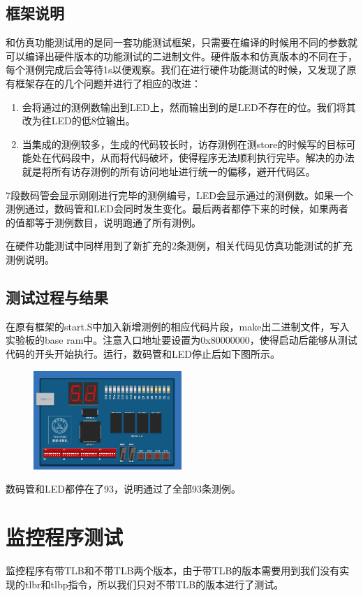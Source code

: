 \documentclass[11pt,utf8]{article}
\begin{document}
{{\subsection{框架说明} {
和仿真功能测试用的是同一套功能测试框架，只需要在编译的时候用不同的参数就可以编译出硬件版本的功能测试的二进制文件。硬件版本和仿真版本的不同在于，每个测例完成后会等待1s以便观察。我们在进行硬件功能测试的时候，又发现了原有框架存在的几个问题并进行了相应的改进：\begin{enumerate}
	\item 会将通过的测例数输出到LED上，然而输出到的是LED不存在的位。我们将其改为往LED的低8位输出。
	\item 当集成的测例较多，生成的代码较长时，访存测例在测store的时候写的目标可能处在代码段中，从而将代码破坏，使得程序无法顺利执行完毕。解决的办法就是将所有访存测例的所有访问地址进行统一的偏移，避开代码区。
\end{enumerate}

7段数码管会显示刚刚进行完毕的测例编号，LED会显示通过的测例数。如果一个测例通过，数码管和LED会同时发生变化。最后两者都停下来的时候，如果两者的值都等于测例数目，说明跑通了所有测例。

在硬件功能测试中同样用到了新扩充的2条测例，相关代码见仿真功能测试的扩充测例说明。
}
\subsection{测试过程与结果} {
在原有框架的start.S中加入新增测例的相应代码片段，make出二进制文件，写入实验板的base ram中。注意入口地址要设置为0x80000000，使得启动后能够从测试代码的开头开始执行。运行，数码管和LED停止后如下图所示。
\begin{figure}[!htb]
	\centering
	\includegraphics[width=0.5\textwidth]{hw_test.jpg}
\end{figure}

数码管和LED都停在了93，说明通过了全部93条测例。
}
}

\section{监控程序测试} {
监控程序有带TLB和不带TLB两个版本，由于带TLB的版本需要用到我们没有实现的tlbr和tlbp指令，所以我们只对不带TLB的版本进行了测试。

}}
\end{document}
